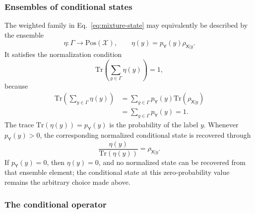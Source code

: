 \documentclass[
    aps,
    pra,
    reprint,
    superscriptaddress,
    nofootinbib
]{revtex4-2}
\theoremstyle{definition}
\theoremstyle{plain}
\begin{document}
\subsubsection{Ensembles of conditional states}

The weighted family in Eq.~\eqref{eq:mixture-state} may equivalently be
described by the ensemble
\begin{equation}
    \eta:\Gamma\to\mathrm{Pos}(\mathcal{X}),
    \qquad
    \eta(y)=p_{\mathsf{Y}}(y)\rho_{\mathsf{X}|y}.
\end{equation}
It satisfies the normalization condition
\begin{equation}
    \mathrm{Tr}
    \left(
        \sum_{y\in\Gamma}\eta(y)
    \right)
    =
    1,
\end{equation}
because
\begin{equation}
    \begin{aligned}
        \mathrm{Tr}
        \left(
            \sum_{y\in\Gamma}\eta(y)
        \right)
        &=
        \sum_{y\in\Gamma}
        p_{\mathsf{Y}}(y)
        \mathrm{Tr}(\rho_{\mathsf{X}|y})\\
        &=
        \sum_{y\in\Gamma}p_{\mathsf{Y}}(y)
        =
        1.
    \end{aligned}
\end{equation}
The trace $\mathrm{Tr}(\eta(y))=p_{\mathsf{Y}}(y)$ is the probability of
the label $y$. Whenever $p_{\mathsf{Y}}(y)>0$, the corresponding normalized
conditional state is recovered through
\begin{equation}
    \frac{\eta(y)}{\mathrm{Tr}(\eta(y))}
    =
    \rho_{\mathsf{X}|y}.
\end{equation}
If $p_{\mathsf{Y}}(y)=0$, then $\eta(y)=0$, and no normalized state can be
recovered from that ensemble element; the conditional state at this
zero-probability value remains the arbitrary choice made above.

\subsubsection{The conditional operator}
\end{document}
